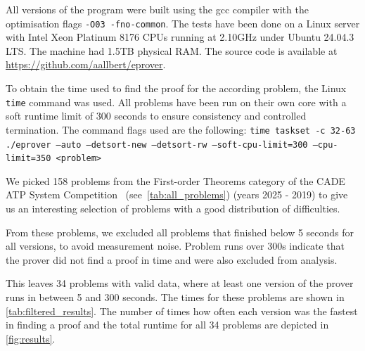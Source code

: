 \documentclass[]{ceurart}
\begin{document}
All versions of the program were built using the gcc compiler with the
optimisation flags \linebreak \texttt{-O03 -fno-common}.  The tests
have been done on a Linux server with Intel Xeon Platinum 8176 CPUs
running at 2.10GHz under Ubuntu 24.04.3 LTS. The machine had 1.5TB
physical RAM. The source code is available at
\url{https://github.com/aallbert/eprover}.

To obtain the time used to find the proof for the according problem,
the Linux \texttt{time} command was used. All problems have been run
on their own core with a soft runtime limit of 300 seconds to ensure
consistency and controlled termination.  The command flags used are
the following: \texttt{time taskset -c 32-63 ./eprover --auto
  --detsort-new --detsort-rw --soft-cpu-limit=300 --cpu-limit=350
  <problem>}

We picked 158 problems from the First-order Theorems category of the
CADE ATP System Competition~\cite{Sutcliffe:AI-2016}
(see~\autoref{tab:all_problems}) (years 2025 - 2019) to give us an
interesting selection of problems with a good distribution of
difficulties.

From these problems, we excluded all problems that finished below 5
seconds for all versions, to avoid measurement noise. Problem runs
over 300s indicate that the prover did not find a proof in time and
were also excluded from analysis.

This leaves 34 problems with valid data, where at least one version of
the prover runs in between 5 and 300 seconds. The times for these
problems are shown in \autoref{tab:filtered_results}. The number of
times how often each version was the fastest in finding a proof and
the total runtime for all 34 problems are depicted in
\autoref{fig:results}.
\end{document}
